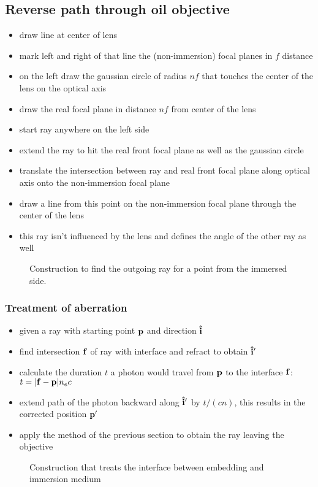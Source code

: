 \documentclass[twocolumn,DIV19]{scrartcl}
\begin{document}
\subsection{Reverse path through oil objective}
\begin{itemize}
\item draw line at center of lens
\item mark left and right of that line the (non-immersion) focal
  planes in $f$ distance
\item on the left draw the gaussian circle of radius $nf$ that touches
  the center of the lens on the optical axis
\item draw the real focal plane in distance $nf$ from center of the
  lens
\item start ray anywhere on the left side
\item extend the ray to hit the real front focal plane as well as the
  gaussian circle
\item translate the intersection between ray and real front focal
  plane along optical axis onto the non-immersion focal plane
\item draw a line from this point on the non-immersion focal plane
  through the center of the lens
\item this ray isn't influenced by the lens and defines the angle of
  the other ray as well
\end{itemize}
 \begin{figure}[!hbt]
   \centering
   
   \caption{Construction to find the outgoing ray for a point from the
     immersed side.}
 \end{figure}
\subsubsection{Treatment of aberration}
\begin{itemize}
\item given a ray with starting point $\mathbf{p}$ and direction $\mathbf{\hat{i}}$
\item find intersection $\mathbf{f}$ of ray with interface and refract to
  obtain $\mathbf{\hat{i}}'$
\item calculate the duration $t$ a photon would travel from $\mathbf{p}$ to
  the interface $\mathbf{f}$: $t=\mathopen| \mathbf{f}-\mathbf{p} \mathclose|n_ec$
\item extend path of the photon backward along $\mathbf{\hat{i}}'$ by $t/(cn)$, this
  results in the corrected position $\mathbf{p}'$
\item apply the method of the previous section to obtain the ray
  leaving the objective
\end{itemize}
 \begin{figure}[!hbt]
   \centering
   
   \caption{Construction that treats the interface between embedding
     and immersion medium}
 \end{figure}
\end{document}
